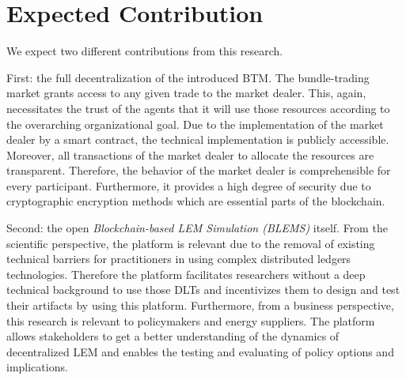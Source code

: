 \section{Expected Contribution}
\label{sec:expected_contribution}

We expect two different contributions from this research. 

First: the full decentralization of the introduced BTM. 
The bundle-trading market grants access to any given trade to the market dealer. 
This, again, necessitates the trust of the agents that it will use those resources
according to the overarching organizational goal. Due to the implementation 
of the market dealer by a smart contract, the technical implementation 
is publicly accessible. Moreover, all transactions of the market dealer 
to allocate the resources are transparent. Therefore, the behavior of the 
market dealer is comprehensible for every participant. Furthermore, it provides 
a high degree of security due to cryptographic encryption methods which are essential 
parts of the blockchain.

Second: the open \textit{Blockchain-based LEM Simulation (BLEMS)} itself. From the scientific perspective, 
the platform is relevant due to the removal of existing technical barriers 
for practitioners in using complex distributed ledgers technologies. 
Therefore the platform facilitates researchers without a deep 
technical background to use those DLTs and incentivizes them to design 
and test their artifacts by using this platform. 
Furthermore, from a business perspective, this research is 
relevant to policymakers and energy suppliers. The platform allows 
stakeholders to get a better understanding of the dynamics of decentralized 
LEM and enables the testing and evaluating of policy options and implications. 

\clearpage